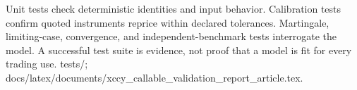 {Unit tests check deterministic identities and input behavior.}
{Calibration tests confirm quoted instruments reprice within declared tolerances.}
{Martingale, limiting-case, convergence, and independent-benchmark tests interrogate the model.}
{A successful test suite is evidence, not proof that a model is fit for every trading use.}
{tests/; docs/latex/documents/xccy\_callable\_validation\_report\_article.tex.}
